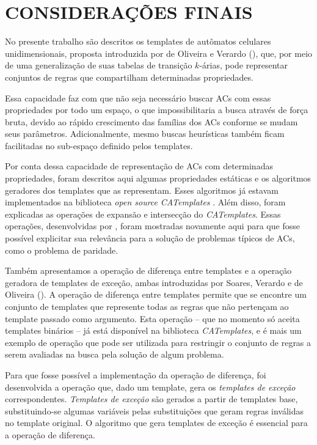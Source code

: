\section{CONSIDERAÇÕES FINAIS}
\label{sec:consideracoesFinais}

No presente trabalho são descritos os templates de autômatos celulares unidimensionais, proposta introduzida por de Oliveira e Verardo (\citeyear{deOliveira2014}), que, por meio de uma generalização de suas tabelas de transição $k$-árias, pode representar conjuntos de regras que compartilham determinadas propriedades.

Essa capacidade faz com que não seja necessário buscar ACs com essas propriedades por todo um espaço, o que impossibilitaria a busca através de força bruta, devido ao rápido crescimento das famílias dos ACs conforme se mudam seus parâmetros. Adicionalmente, mesmo buscas heurísticas também ficam facilitadas no sub-espaço definido pelos templates.

Por conta dessa capacidade de representação de ACs com determinadas propriedades, foram descritos aqui algumas propriedades estáticas e os algoritmos geradores dos templates que as representam. Esses algoritmos já estavam implementados na biblioteca \textit{open source} \textit{CATemplates} \cite{CATemplates}. Além disso, foram explicadas as operações de expansão e intersecção do \textit{CATemplates}. Essas operações, desenvolvidas por , foram mostradas novamente aqui para que fosse possível explicitar sua relevância para a solução de problemas típicos de ACs, como o problema de paridade.

Também apresentamos a operação de diferença entre templates e a operação geradora de templates de exceção, ambas introduzidas por Soares, Verardo e de Oliveira (\citeyear{soares2016difference}). A operação de diferença entre templates permite que se encontre um conjunto de templates que represente todas as regras que não pertençam ao template passado como argumento. Esta operação -- que no momento só aceita templates binários -- já está disponível na biblioteca \textit{CATemplates}, e é mais um exemplo de operação que pode ser utilizada para restringir o conjunto de regras a serem avaliadas na busca pela solução de algum problema.

Para que fosse possível a implementação da operação de diferença, foi desenvolvida a operação que, dado um template, gera os \textit{templates de exceção} correspondentes. \textit{Templates de exceção} são gerados a partir de templates base, substituindo-se algumas variáveis pelas substituições que geram regras inválidas no template original. O algoritmo que gera templates de exceção é essencial para a operação de diferença.

